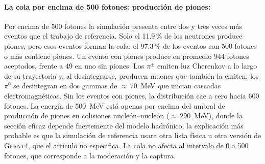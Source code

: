 \begin{table}[!htbp]
	\centering
	\small
	\captionsetup{width=\linewidth,justification=justified,singlelinecheck=false}
	\caption[Cuentas por intervalo de fotones aceptados y producción de piones]{Cuentas absolutas por intervalo de fotones aceptados en \textcolor{red}{agua pura} (eventos con al menos un fotón) y fracción de eventos con producción de piones en alguna interacción inelástica de un neutrón. Un mismo evento puede tener piones cargados y neutros.}
	\label{tab:fotones-intervalos}
	\renewcommand{\arraystretch}{1.15}
\end{table}

\paragraph{La cola por encima de 500 fotones: producción de piones:} Por encima de 500 fotones la simulación presenta entre dos y tres veces más eventos que el trabajo de referencia. Solo el 11.9\,\% de los neutrones produce piones, pero esos eventos forman la cola: el 97.3\,\% de los eventos con 500 fotones o más contiene piones. Un evento con piones produce en promedio 944 fotones aceptados, frente a 49 en uno sin piones. Los $\pi^{\pm}$ emiten luz Cherenkov a lo largo de su trayectoria y, al desintegrarse, producen muones que también la emiten; los $\pi^{0}$ se desintegran en dos gammas de $\approx$\,70~MeV que inician cascadas electromagnéticas. Sin los eventos con piones, la distribución cae a cero hacia 600 fotones. La energía de 500~MeV está apenas por encima del umbral de producción de piones en colisiones nucleón--nucleón ($\approx$\,290~MeV), donde la sección eficaz depende fuertemente del modelo hadrónico; la explicación más probable es que la simulación de referencia usara otra lista física u otra versión de \textsc{Geant4}, que el artículo no especifica. La cola no afecta al intervalo de 0 a 500 fotones, que corresponde a la moderación y la captura.

